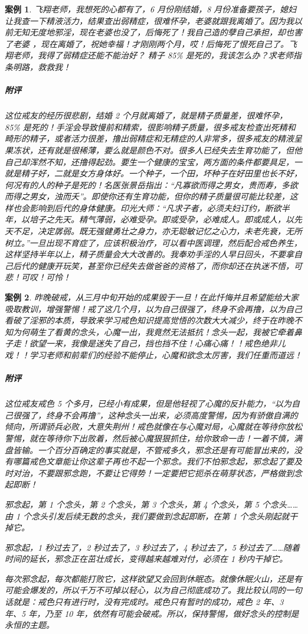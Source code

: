 \documentclass{ctexart}
\newtheorem{case}{案例}
\begin{document}
\begin{case}
    飞翔老师，我想死的心都有了，6 月份刚结婚，8 月份准备要孩子，媳妇让我查一下精液活力，结果查出弱精症，很难怀孕，老婆就跟我离婚了。因为我以前无知无度地邪淫，现在老婆也没了，后悔死了！我自己造的孽自己承担，却也害了老婆 ，现在离婚了，祝她幸福！才刚刚两个月，哎！后悔死了恨死自己了。飞翔老师，我得了弱精症还能不能治好？ 精子 85\% 是死的，我该怎么办？求老师指条明路，救救我！
    \subparagraph{附评} 这位戒友的经历很悲剧，结婚 2 个月就离婚了，就是精子质量差，很难怀孕，85\% 是死的！手淫会导致慢前和精索，很影响精子质量，很多戒友检查出死精和畸形的精子，或者活力很差，撸出弱精症和无精症的人非常多，很多戒友的精液呈果冻状，还有就是很稀薄，要么就是颜色不对。很多人已经失去生育功能了，但他自己却浑然不知，还撸得起劲。要生一个健康的宝宝，两方面的条件都要具足，一就是精子好，二就是女方身体好。一个种子，一个田，坏种子在好田里也长不好，何况有的人的种子是死的！名医张景岳指出：“凡寡欲而得之男女，贵而寿，多欲而得之男女，浊而夭”。即使你还有生育功能，但你的精子质量很可能比较差，这样也会影响到后代的身体健康。印光大师：“凡求子者，必须夫妇订约，断欲半年，以培子之先天。精气薄弱，必难受孕。即或受孕，必难成人。即或成人，以先天不足，决定孱弱。既无强健勇壮之身力，亦无聪敏记忆之心力，未老先衰，无所树立。”一旦出现不育症了，应该积极治疗，可以看中医调理，然后配合戒色养生，这样坚持半年以上，精子质量会大大改善的。我奉劝手淫的人早日回头，不要拿自己后代的健康开玩笑，甚至你已经失去做爸爸的资格了，而你却还在执迷不悟，可悲！可叹！可怜！
\end{case}

\begin{case}
    昨晚破戒，从三月中旬开始的成果毁于一旦！在此忏悔并且希望能给大家吸取教训，增强警惕！戒了这几个月，以为自己很强了，终身不会再撸，以为自己看破了淫邪的本质，导致来学习戒色知识提高觉悟的次数大大减少，终于在昨晚不知为何萌生了看黄的念头，心魔一出，我竟然无法抵抗！念头一起，我被它牵着鼻子走！欲望一来，我像是迷失了自己，挡也挡不住！心痛心痛！！戒色绝非儿戏！！学习老师和前辈们的经验不能停止，心魔和欲念太厉害，我们任重而道远！
    \subparagraph{附评} 这位戒友戒色 5 个多月，已经小有成果，但是他轻视了心魔的反扑能力，“以为自己很强了，终身不会再撸”，这种念头一出来，必须高度警惕，因为有骄傲自满的倾向，所谓骄兵必败，大意失荆州！戒色就像在与心魔对局，心魔就在等待你放松警惕，就在等待你下出败着，然后被心魔狠狠抓住，给你致命一击！一着不慎，满盘皆输。一个百分百确定的事实就是，不管戒多久，邪念还是有可能冒出来的，没有哪篇戒色文章能让你这辈子再也不起一个邪念。我们不怕邪念起，邪念起了要及时对治，不要跟邪念跑，不要让它得势！一定要把它扼杀在萌芽状态，严格做到念起即断！

    邪念起，第 1 个念头，第 2 个念头，第 3 个念头，第 4 个念头，第 5 个念头……由 1 个念头引发后续无数的念头，我们要做到念起即断，在第 1 个念头刚起就干掉它。

    邪念起，1 秒过去了，2 秒过去了，3 秒过去了，4 秒过去了，5 秒过去了……随着时间的延长，邪念正在茁壮成长，变得越来越难对付，必须在 1 秒内干掉它。

    每次邪念起，每次都能打败它，这样欲望又会回到休眠态。就像休眠火山，还是有可能会爆发的，所以千万不可掉以轻心，以为自己彻底成功了。我比较认同的一句话就是：戒色只有进行时，没有完成时。戒色只有暂时的成功，戒色 2 年、3 年、5 年，乃至 10 年，依然有可能会破戒。所以，保持警惕，做好念头的控制是永恒的主题。
\end{case}
\end{document}
